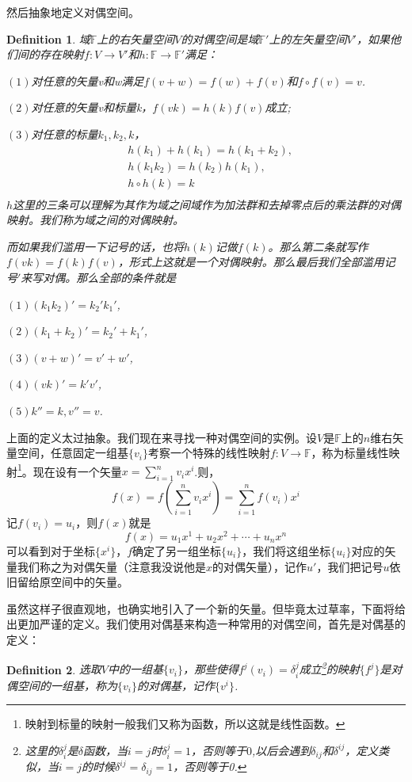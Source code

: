 \documentclass[11pt,a4paper,openany]{book}%
\theoremstyle{plain}%
\newtheorem{defi}{Definition}[chapter]%
\newcommand{\NO}[1]{{$(#1)$}}%
\begin{document}
然后抽象地定义对偶空间。
\begin{defi}域$\mathbb{F}$上的右矢量空间$V$的对偶空间是域$\mathbb{F'}$上的左矢量空间$V'$，如果他们间的存在映射$f:V\rightarrow V'$和$h:\mathbb{F} \rightarrow \mathbb{F'}$满足：

\NO{1}对任意的矢量v和w满足$f(v+w)=f(w)+f(v)$和$f\circ f(v)=v$.

\NO{2}对任意的矢量v和标量k，$f(vk)=h(k)f(v)$成立;

\NO{3}对任意的标量$k_1,k_2,k$，
\[
\begin{split}
&h(k_1)+h(k_1)=h(k_1+k_2),\\
&h(k_1k_2)=h(k_2)h(k_1),\\
&h\circ h (k)=k\\
\end{split}
\]
$h$这里的三条可以理解为其作为域之间域作为加法群和去掉零点后的乘法群的对偶映射。我们称为域之间的对偶映射。

而如果我们滥用一下记号的话，也将$h(k)$记做$f(k)$。那么第二条就写作$f(vk)=f(k)f(v)$，形式上这就是一个对偶映射。那么最后我们全部滥用记号$'$来写对偶。那么全部的条件就是

\NO{1}$(k_1k_2)'=k_2'k_1'$,

\NO{2}$(k_1+k_2)'=k_2'+k_1'$,

\NO{3}$(v+w)'=v'+w'$,

\NO{4}$(vk)'=k'v'$,

\NO{5}$k''=k,v''=v$.
\end{defi}
上面的定义太过抽象。我们现在来寻找一种对偶空间的实例。设$V$是$\mathbb{F}$上的$n$维右矢量空间，任意固定一组基$\{v_i\}$考察一个特殊的线性映射$f:V\rightarrow \mathbb{F}$，称为标量线性映射\footnote{映射到标量的映射一般我们又称为函数，所以这就是线性函数。}。现在设有一个矢量$x=\sum_{i=1}^{n}v_{i}x^{i}$.则，
\[
f(x)=f\left(\sum_{i=1}^{n}v_{i}x^{i}\right)=
\sum_{i=1}^{n}f(v_{i})x^{i}
\]
记$f(v_{i})=u_i$，则$f(x)$就是
\begin{equation}
\label{1222}
f(x)=u_1x^1+u_2x^2+\cdots+u_nx^n
\end{equation}
可以看到对于坐标$\{x^i\}$，$f$确定了另一组坐标$\{u_i\}$，我们将这组坐标$\{u_i\}$对应的矢量我们称之为{\kaishu 对偶矢量}（注意我没说他是$x$的对偶矢量），记作$u'$，我们把记号$u$依旧留给原空间中的矢量。

虽然这样子很直观地，也确实地引入了一个新的矢量。但毕竟太过草率，下面将给出更加严谨的定义。我们使用对偶基来构造一种常用的对偶空间，首先是对偶基的定义：
\begin{defi}
选取$V$中的一组基$\{v_i\}$，那些使得$f^j(v_i)=\delta_i^j$成立\footnote{这里的$\delta_i^j$是$\delta$函数，当$i=j$时$\delta_i^j=1$，否则等于$0$,以后会遇到$\delta_{ij}$和$\delta^{ij}$，定义类似，当$i=j$的时候$\delta^{ij}=\delta_{ij}=1$，否则等于0.}的映射$\{f^j\}$是对偶空间的一组基，称为$\{v_i\}$的对偶基，记作$\{v^i\}$.
\end{defi}
\end{document}

